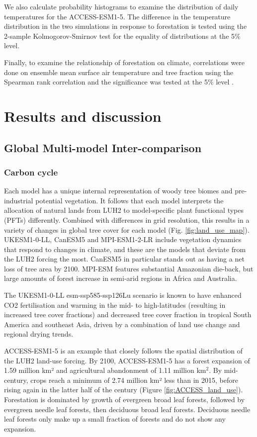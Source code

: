 \documentclass[]{article}
\begin{document}
We also calculate probability histograms to examine the distribution of daily temperatures for the ACCESS-ESM1-5.
The difference in the temperature distribution in the two simulations in response to forestation is tested using the 2-sample Kolmogorov-Smirnov test for the equality of distributions at the 5\% level.

Finally, to examine the relationship of forestation on climate, correlations were done on ensemble mean surface air temperature and tree fraction using the Spearman rank correlation and the significance was tested at the 5\% level \parencite{kokoska2000crc}.

\section{Results and discussion}

\subsection{Global Multi-model Inter-comparison}

\subsubsection{Carbon cycle}

Each model has a unique internal representation of woody tree biomes and pre-industrial potential vegetation.
It follows that each model interprets the allocation of natural lands from LUH2 to model-specific plant functional types (PFTs) differently.
Combined with differences in grid resolution, this results in a variety of changes in global tree cover for each model (Fig. \ref{fig:land_use_map}).
UKESM1-0-LL, CanESM5 and MPI-ESM1-2-LR include vegetation dynamics that respond to changes in climate, and these are the models that deviate from the LUH2 forcing the most.
CanESM5 in particular stands out as having a net loss of tree area by 2100.
MPI-ESM features substantial Amazonian die-back, but large amounts of forest increase in semi-arid regions in Africa and Australia.

The UKESM1-0-LL esm-ssp585-ssp126Lu scenario is known to have enhanced CO2 fertilisation and warming in the mid- to high-latitudes (resulting in increased tree cover fractions) and decreased tree cover fraction in tropical South America and southeast Asia, driven by a combination of land use change and regional drying trends.

ACCESS-ESM1-5 is an example that closely follows the spatial distribution of the LUH2 land-use forcing.
By 2100, ACCESS-ESM1-5 has a forest expansion of 1.59 million km² and agricultural abandonment of 1.11 million km$^2$.
By mid-century, crops reach a minimum of 2.74 million km² less than in 2015, before rising again in the latter half of the century (Figure \ref{fig:ACCESS_land_use}).
Forestation is dominated by growth of evergreen broad leaf forests, followed by evergreen needle leaf forests, then deciduous broad leaf forests.
Deciduous needle leaf forests only make up a small fraction of forests and do not show any expansion.
\end{document}
